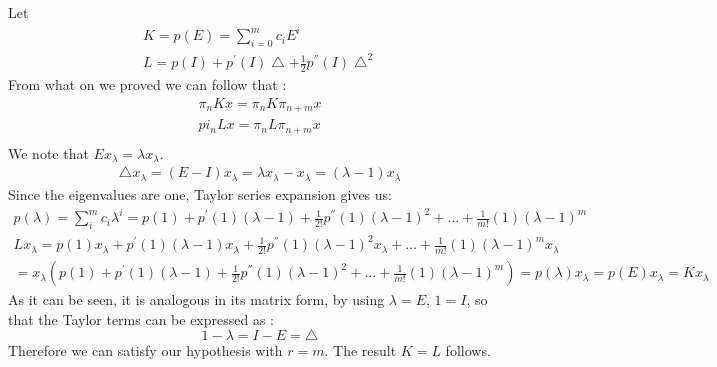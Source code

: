 Let 
\begin{gather*}
K = p(E) = \sum\limits_{i =0}^m c_i E^i \\
L = p(I) + p^{'}(I)\bigtriangleup + \frac{1}{2} p^{''}(I) \bigtriangleup^2 
\end{gather*}
From what on we proved we can follow that :
\begin{gather*}
\pi_n K x = \pi_n K \pi_{n+m} x \\
pi_n L x = \pi_n L \pi_{n+m} x \\
\end{gather*}
We note that $E x_{\lambda} = \lambda x_{\lambda}$.
\begin{gather*}
\bigtriangleup x_{\lambda} = (E-I)x_{\lambda} = \lambda x_{\lambda} - x_{\lambda} = (\lambda -1 ) x_{\lambda}
\end{gather*}
Since the eigenvalues are one, Taylor series expansion gives us:
\begin{gather*}
p(\lambda) = \sum\limits_{i}^m c_i \lambda^i = p(1) + p^{'}(1)(\lambda-1) + \frac{1}{2!} p^{''} (1)(\lambda-1)^2 + \ldots + \frac{1}{m!} (1) (\lambda -1)^m\\
L x_{\lambda} =  p(1) x_{\lambda} + p^{'}(1)(\lambda-1) x_{\lambda} + \frac{1}{2!} p^{''} (1)(\lambda-1)^2 x_{\lambda} + \ldots + \frac{1}{m!} (1) (\lambda -1)^m x_{\lambda} \\
= x_{\lambda} \left( p(1) + p^{'}(1)(\lambda-1) + \frac{1}{2!} p^{''} (1)(\lambda-1)^2 + \ldots + \frac{1}{m!} (1) (\lambda -1)^m \right) = p(\lambda)x_{\lambda} = p(E)x_{\lambda} = K x_{\lambda}
\end{gather*}
As it can be seen, it is analogous in its matrix form, by using $\lambda = E$, $ 1 = I $, so that the Taylor terms can be expressed as :
\begin{equation*}
1-\lambda = I - E = \bigtriangleup
\end{equation*}
Therefore we can satisfy our hypothesis with $r = m$. The result $K=L$ follows.
